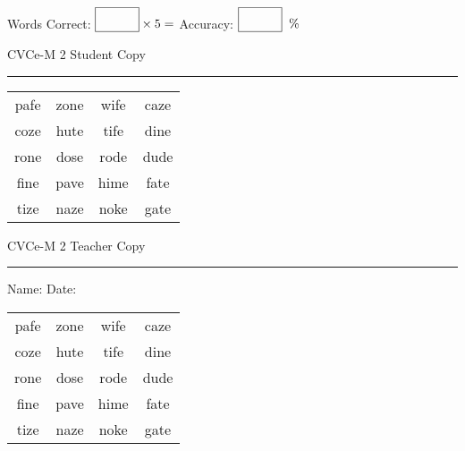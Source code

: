 \documentclass{memoir}
\begin{document}
\small

Words Correct: $\fbox{\phantom{\huge 100}} \times 5 = $ Accuracy: $\fbox{\phantom{\huge 100}}\;\; \%$ 

\vfill

\newpage


\footnotesize \noindent
CVCe-M 2 \hfill Student Copy
\smallskip
\hrule

\Large

\setlength{\tabcolsep}{14pt}
\def\arraystretch{2}

{\selectfont


\begin{vplace}[0.5]
\begin{center}
\begin{tabular}{cccc}
pafe & zone & wife & caze \\
coze & hute & tife & dine \\
rone & dose & rode & dude \\
fine & pave & hime & fate \\
tize & naze & noke & gate \\
\end{tabular}
\end{center}
\end{vplace}

}

\newpage

\footnotesize \noindent
CVCe-M 2 \hfill Teacher Copy
\smallskip
\hrule

\small

\vfill

\noindent
Name: \underline{\hspace{1.75in}} \hfill Date: \underline{\hspace{1in}}

\Large

{\selectfont


\begin{vplace}[0.5]
\begin{center}
\begin{tabular}{cccc}
pafe & zone & wife & caze \\
coze & hute & tife & dine \\
rone & dose & rode & dude \\
fine & pave & hime & fate \\
tize & naze & noke & gate \\
\end{tabular}
\end{center}
\end{vplace}



}
\end{document}
